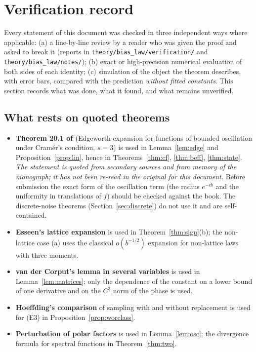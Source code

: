 \section{Verification record}\label{sec:verif}

Every statement of this document was checked in three independent ways where applicable: (a) a line-by-line review by
a reader who was given the proof and asked to break it (reports in \texttt{theory/bias\_law/verification/} and \texttt{theory/bias\_law/notes/});
(b) exact or high-precision numerical evaluation of both sides of each identity; (c) simulation of the object the
theorem describes, with error bars, compared with the prediction \emph{without fitted constants}. This section
records what was done, what it found, and what remains unverified.

\subsection{What rests on quoted theorems}
\begin{itemize}\setlength\itemsep{2pt}
\item \textbf{Theorem 20.1 of \citet{br}} (Edgeworth expansion for functions of bounded oscillation under Cram\'er's
condition, $s=3$) is used in Lemma~\ref{lem:edge} and Proposition~\ref{prop:lin}, hence in
Theorems~\ref{thm:cf}, \ref{thm:beff}, \ref{thm:state}. \emph{The statement is quoted from secondary sources and from
memory of the monograph; it has not been re-read in the original for this document.} Before submission the exact form
of the oscillation term (the radius $e^{-cb}$ and the uniformity in translations of $f$) should be checked against the
book. The discrete-noise theorems (Section~\ref{sec:discrete}) do not use it and are self-contained.
\item \textbf{Esseen's lattice expansion} \citep[\S43]{gk} is used in Theorem~\ref{thm:sign}(b); the non-lattice case (a)
uses the classical $o(b^{-1/2})$ expansion for non-lattice laws with three moments.
\item \textbf{van der Corput's lemma in several variables} \citep[Ch.~VIII, \S2.2, Prop.~5]{stein} is used in
Lemma~\ref{lem:matrices}; only the dependence of the constant on a lower bound of one derivative and on the $C^{3}$ norm
of the phase is used.
\item \textbf{Hoeffding's comparison} of sampling with and without replacement \citep[Thm.~4]{hoeffding} is used for
(E3) in Proposition~\ref{prop:worclass}.
\item \textbf{Perturbation of polar factors} \citep{lisun} is used in Lemma~\ref{lem:osc}; the divergence formula
for spectral functions \citep{candes} in Theorem~\ref{thm:two}.
\end{itemize}

